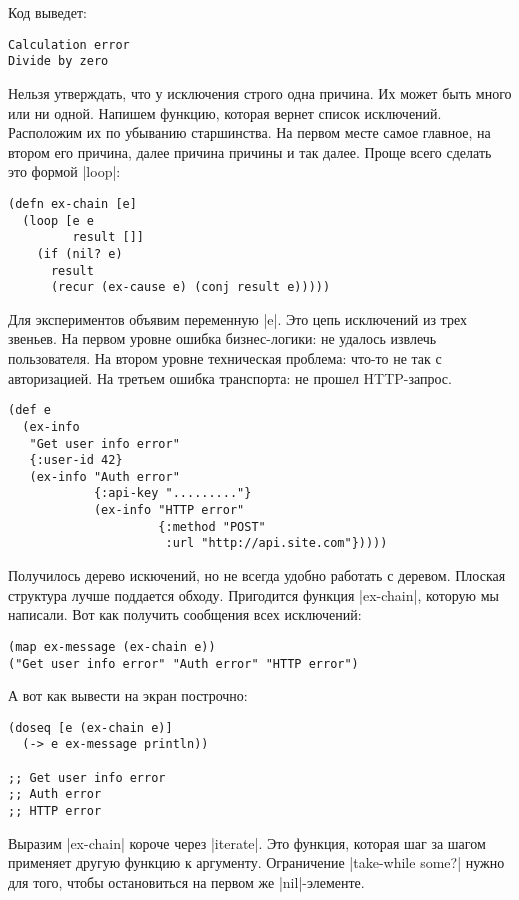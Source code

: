 \noindent
Код выведет:

\begin{verbatim}
Calculation error
Divide by zero
\end{verbatim}

Нельзя утверждать, что у исключения строго одна причина. Их может быть много или
ни одной. Напишем функцию, которая вернет список исключений. Расположим их по
убыванию старшинства. На первом месте самое главное, на втором его причина,
далее причина причины и так далее. Проще всего сделать это формой \spverb|loop|:

\begin{verbatim}
(defn ex-chain [e]
  (loop [e e
         result []]
    (if (nil? e)
      result
      (recur (ex-cause e) (conj result e)))))
\end{verbatim}

Для экспериментов объявим переменную \spverb|e|. Это цепь исключений из трех
звеньев. На первом уровне ошибка бизнес-логики: не удалось извлечь
пользователя. На втором уровне техническая проблема: что-то не так с
авторизацией. На третьем ошибка транспорта: не прошел HTTP-запрос.

\begin{verbatim}
(def e
  (ex-info
   "Get user info error"
   {:user-id 42}
   (ex-info "Auth error"
            {:api-key "........."}
            (ex-info "HTTP error"
                     {:method "POST"
                      :url "http://api.site.com"}))))
\end{verbatim}

Получилось дерево искючений, но не всегда удобно работать с деревом. Плоская
структура лучше поддается обходу. Пригодится функция \spverb|ex-chain|, которую
мы написали. Вот как получить сообщения всех исключений:

\begin{verbatim}
(map ex-message (ex-chain e))
("Get user info error" "Auth error" "HTTP error")
\end{verbatim}

\noindent
А вот как вывести на экран построчно:

\begin{verbatim}
(doseq [e (ex-chain e)]
  (-> e ex-message println))

;; Get user info error
;; Auth error
;; HTTP error
\end{verbatim}

Выразим \spverb|ex-chain| короче через \spverb|iterate|. Это функция, которая
шаг за шагом применяет другую функцию к аргументу. Ограничение
\spverb|take-while some?| нужно для того, чтобы остановиться на первом же
\spverb|nil|-элементе.

